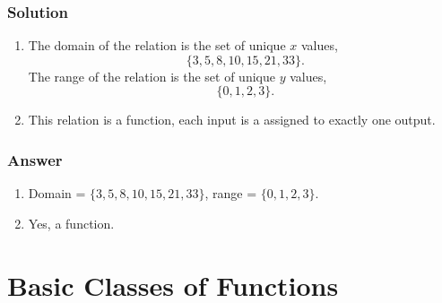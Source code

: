 \documentclass[11pt, letterpaper, oneside]{memoir}
\begin{document}
\subsubsection{Solution}

\begin{enumerate}[label=(\alph*)]
  \item The domain of the relation is the set of unique $ x $ values,
    $$ \phantom{.}
    \{ 3, 5, 8, 10, 15, 21, 33 \}
    .$$
    The range of the relation is the set of unique $ y $ values,
    $$ \phantom{.}
    \{ 0, 1, 2, 3\}
    .$$
  \item This relation is a function, each input is a assigned to exactly one output.
\end{enumerate}

\subsubsection{Answer}

\begin{enumerate}[label=(\alph*)]
  \item Domain = $  \{ 3, 5, 8, 10, 15, 21, 33 \} $, range = $ \{ 0, 1, 2, 3\} $.
  \item Yes, a function.
\end{enumerate}













\section{Basic Classes of Functions}






\end{document}
